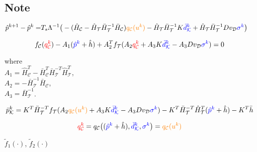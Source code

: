 


\frontmatter
{}

\subsection{Note}

\begin{align}
\label{WT_matrixform_final_discrete1}
\nonumber  \hat{p}^{k+1} - \hat{p}^{k}   =& T_s \Lambda^{-1} \big(- (\hat{H}_{\mathcal{C}} - \hat{H}_{\mathcal{T}} \bar{H}^{-1}_{\mathcal{T}}\bar{H}_{\mathcal{C}})  \textcolor{orange}{q_{\mathcal{C}}(u^k)}  - \hat{H}_{\mathcal{T}} \bar{H}^{-1}_{\mathcal{T}} K \textcolor{blue}{\bar{d}^{k}_{\mathcal{K}}} + \hat{H}_{\mathcal{T}} \bar{H}^{-1}_{\mathcal{T}} D v_{\mathcal{D}} \textcolor{blue}{\sigma^{k}} \big) 
\end{align}


 \begin{equation}
\label{meshresult2_WT_model1}
f_{\mathcal{C}}(\textcolor{red}{q^k_\mathcal{C}}) - A_1(\textcolor{blue}{\hat{p}^k} + \hat{h}) + A_2^T f_{\mathcal{T}}(A_2 \textcolor{red}{q^k_\mathcal{C}} + A_3 K \textcolor{blue}{\bar{d}^k_{\mathcal{K}}} - A_3 D v_{\mathcal{D}} \textcolor{blue}{\sigma^k}) = 0
\end{equation} 

\begin{minipage}[t]{0.4\textwidth}
where\\
\hspace*{8mm} $A_1 = \hat{H}^T_{\mathcal{C}} -\bar{H}^T_{\mathcal{C}}\bar{H}^{-T}_{\mathcal{T}}\hat{H}^T_{\mathcal{T}}$, \vspace*{1.5mm}  \\
\hspace*{8mm} $A_2 = -\bar{H}^{-1}_{\mathcal{T}} \bar{H}_{\mathcal{C}} $, \vspace*{1.5mm}\\
\hspace*{8mm} $A_3 = \bar{H}^{-1}_{\mathcal{T}}$.
\end{minipage}

\begin{equation}
  \label{non-inlet_p_WT1}
  \bar{p}^k_{\mathcal{K}} = K^T \bar{H}^{-T}_{\mathcal{T}}f_{\mathcal{T}}(A_2 \textcolor{orange}{q_{\mathcal{C}}(u^k)} + A_3 K \textcolor{blue}{\bar{d}^k_{\mathcal{K}}} - A_3 D v_{\mathcal{D}} \textcolor{blue}{\sigma^k}) - K^T\bar{H}^{-T}_{\mathcal{T}}\hat{H}^{T}_{\mathcal{T}} (\textcolor{blue}{\hat{p}^k} + \hat{h}) - K^T\bar{h} 
\end{equation}

 \begin{equation}
\label{qc_abstraction}
\textcolor{red}{q^{k}_{\mathcal{C}}} = q_{\mathcal{C}} \big( (\textcolor{blue}{\hat{p}^{k}} + \hat{h}),\textcolor{blue}{\bar{d}^{k}_{\mathcal{K}}}, \textcolor{blue}{\sigma^{k}} \big) = \textcolor{orange}{q_{\mathcal{C}}(u^k)}
\end{equation} 


$\tilde{f}_1(\cdot)$, $\tilde{f}_2(\cdot)$




